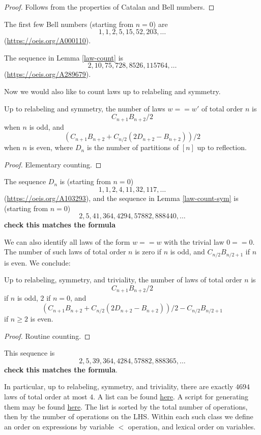 \begin{proof} Follows from the properties of Catalan and Bell numbers.
\end{proof}

The first few Bell numbers (starting from $n=0$) are
$$ 1, 1, 2, 5, 15, 52, 203, \dots$$
(\href{OEIS A000110}{https://oeis.org/A000110}).

The sequence in Lemma \ref{law-count} is
$$ 2, 10, 75, 728, 8526, 115764, \dots$$
(\href{OEIS A289679}{https://oeis.org/A289679}).

Now we would also like to count laws up to relabeling and symmetry.

\begin{lemma}\label{law-count-sym} Up to relabeling and symmetry, the number of laws $w == w'$ of total order $n$ is
$$ C_{n+1} B_{n+2}/2$$
when $n$ is odd, and
$$ (C_{n+1} B_{n+2} + C_{n/2} (2D_{n+2} - B_{n+2}))/2$$
when $n$ is even, where $D_n$ is the number of partitions of $[n]$ up to reflection.
\end{lemma}

\begin{proof} Elementary counting.
\end{proof}

The sequence $D_n$ is (starting from $n=0$)
$$ 1, 1, 2, 4, 11, 32, 117, \dots$$
(\href{OEIS A103293}{https://oeis.org/A103293}), and the sequence in Lemma \ref{law-count-sym} is (starting from $n=0$)
$$ 2, 5, 41, 364, 4294, 57882, 888440, \dots$$
{\bf check this matches the formula}

We can also identify all laws of the form $w==w$ with the trivial law $0==0$.  The number of such laws of total order $n$ is zero if $n$ is odd, and $C_{n/2} B_{n/2+1}$ if $n$ is even.  We conclude:

\begin{lemma}  Up to relabeling, symmetry, and triviality, the number of laws of total order $n$ is
$$ C_{n+1} B_{n+2}/2$$
if $n$ is odd, $2$ if $n = 0$, and
$$ (C_{n+1} B_{n+2} + C_{n/2} (2D_{n+2} - B_{n+2}))/2 - C_{n/2} B_{n/2+1}$$
if $n \geq 2$ is even.
\end{lemma}

\begin{proof} Routine counting.
\end{proof}

This sequence is
$$2, 5, 39, 364, 4284, 57882, 888365, \dots$$
{\bf check this matches the formula}.

In particular, up to relabeling, symmetry, and triviality, there are exactly $4694$ laws of total order at most $4$.  A list can be found \href{https://github.com/teorth/equational_theories/blob/main/data/equations.txt}{here}.  A script for generating them may be found \href{https://github.com/teorth/equational_theories/blob/main/scripts/generate_eqs_list.py}{here}.  The list is sorted by the total number of operations, then by the number of operations on the LHS. Within each such class we define an order on expressions by variable $<$ operation, and lexical order on variables.
